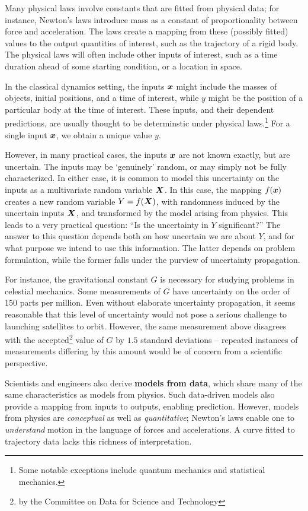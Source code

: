 \documentclass[../primer.tex]{subfiles}
\begin{document}
Many physical laws involve constants that are fitted from physical data; for
instance, Newton's laws introduce mass as a constant of proportionality between
force and acceleration. The laws create a mapping from these (possibly fitted)
values to the output quantities of interest, such as the trajectory of a rigid
body. The physical laws will often include other inputs of interest, such as a
time duration ahead of some starting condition, or a location in space.

In the classical dynamics setting, the inputs $\boldsymbol{x}$ might include the masses of
objects, initial positions, and a time of interest, while $y$ might be the
position of a particular body at the time of interest. These inputs, and their
dependent predictions, are usually thought to be determinstic under physical
laws.\footnote{Some notable exceptions include quantum mechanics and statistical
  mechanics.} For a single input $\boldsymbol{x}$, we obtain a unique value $y$.

However, in many practical cases, the inputs $\boldsymbol{x}$ are not known exactly, but
are uncertain. The inputs may be `genuinely' random, or may simply not be fully
characterized. In either case, it is common to model this uncertainty on the
inputs as a multivariate random variable $\boldsymbol{X}$. In this case, the mapping
$f(\boldsymbol{x})$ creates a new random variable $Y = f(\boldsymbol{X})$, with randomness induced by
the uncertain inputs $\boldsymbol{X}$, and transformed by the model arising from physics.
This leads to a very practical question: ``Is the uncertainty in $Y$
significant?'' The answer to this question depends both on how uncertain we are
about $Y$, and for what purpose we intend to use this information. The latter
depends on problem formulation, while the former falls under the purview of
uncertainty propagation.

For instance, the gravitational constant $G$ is necessary for studying problems
in celestial mechanics. Some measurements of $G$ have uncertainty on the order
of 150 parts per million.\cite{rosi2014precision} Even without elaborate
uncertainty propagation, it seems reasonable that this level of uncertainty
would not pose a serious challenge to launching satellites to orbit. However,
the same measurement above disagrees with the accepted\footnote{by the Committee
  on Data for Science and Technology} value of $G$ by $1.5$ standard deviations
-- repeated instances of measurements differing by this amount would be of
concern from a scientific perspective.

Scientists and engineers also derive \textbf{models from data}, which share many
of the same characteristics as models from physics. Such data-driven models also
provide a mapping from inputs to outputs, enabling prediction. However, models
from physics are \emph{conceptual} as well as \emph{quantitative}; Newton's laws
enable one to \emph{understand} motion in the language of forces and
accelerations. A curve fitted to trajectory data lacks this richness of
interpretation.
\end{document}
